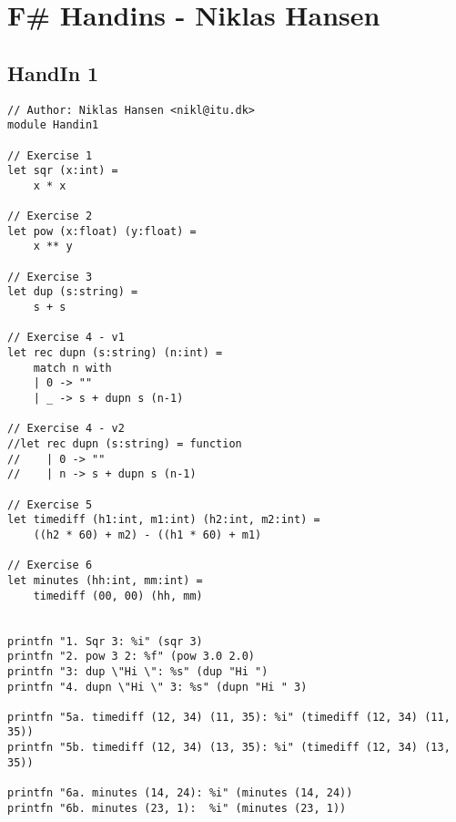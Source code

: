 \section{F\# Handins - Niklas Hansen}
\label{Appendix_FSharp_Niklas}

\subsection{HandIn 1}
\label{Appendix_FSharp_Niklas_1}
\begin{lstlisting}
// Author: Niklas Hansen <nikl@itu.dk>
module Handin1

// Exercise 1
let sqr (x:int) =
    x * x

// Exercise 2
let pow (x:float) (y:float) =
    x ** y

// Exercise 3
let dup (s:string) =
    s + s

// Exercise 4 - v1
let rec dupn (s:string) (n:int) =
    match n with
    | 0 -> ""
    | _ -> s + dupn s (n-1)

// Exercise 4 - v2
//let rec dupn (s:string) = function
//    | 0 -> ""
//    | n -> s + dupn s (n-1)

// Exercise 5
let timediff (h1:int, m1:int) (h2:int, m2:int) = 
    ((h2 * 60) + m2) - ((h1 * 60) + m1)

// Exercise 6
let minutes (hh:int, mm:int) =
    timediff (00, 00) (hh, mm)


printfn "1. Sqr 3: %i" (sqr 3)
printfn "2. pow 3 2: %f" (pow 3.0 2.0)
printfn "3: dup \"Hi \": %s" (dup "Hi ")
printfn "4. dupn \"Hi \" 3: %s" (dupn "Hi " 3)

printfn "5a. timediff (12, 34) (11, 35): %i" (timediff (12, 34) (11, 35))
printfn "5b. timediff (12, 34) (13, 35): %i" (timediff (12, 34) (13, 35))

printfn "6a. minutes (14, 24): %i" (minutes (14, 24))
printfn "6b. minutes (23, 1):  %i" (minutes (23, 1))
\end{lstlisting}
